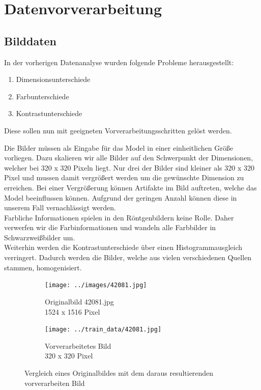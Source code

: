\chapter{Datenvorverarbeitung}
\label{ch:data_preprocessing}

\section{Bilddaten}

In der vorherigen Datenanalyse wurden folgende Probleme herausgestellt:

\begin{enumerate}
	\item{Dimensionsunterschiede}
	\item{Farbunterschiede}
	\item{Kontrastunterschiede}
\end{enumerate}

Diese sollen nun mit geeigneten Vorverarbeitungsschritten gelöst werden.

Die Bilder müssen als Eingabe für das Model in einer einheitlichen Größe vorliegen. Dazu skalieren wir alle Bilder auf den Schwerpunkt der Dimensionen, welcher bei 320 x 320 Pixeln liegt.
Nur drei der Bilder sind kleiner als 320 x 320 Pixel und mussen damit vergrößert werden um die gewünschte Dimension zu erreichen. Bei einer Vergrößerung können Artifakte im Bild auftreten, welche das Model beeinflussen können. Aufgrund der geringen Anzahl können diese in unserem Fall vernachlässigt werden.\\
Farbliche Informationen spielen in den Röntgenbildern keine Rolle. Daher verwerfen wir die Farbinformationen und wandeln alle Farbbilder in Schwarzweißbilder um.\\
Weiterhin werden die Kontrastunterschiede über einen Histogrammausgleich verringert. Dadurch werden die Bilder, welche aus vielen verschiedenen Quellen stammen, homogenisiert.

\begin{figure}[H]
	\centering
	\begin{subfigure}[b]{0.45\textwidth}
		\centering
		\texttt{[image: ../images/42081.jpg]}
		\caption{Originalbild 42081.jpg\\1524 x 1516 Pixel}
	\end{subfigure} \hfill
	\begin{subfigure}[b]{0.45\textwidth}
		\centering
		\texttt{[image: ../train\_data/42081.jpg]}
		\caption{Vorverarbeitetes Bild\\320 x 320 Pixel}
	\end{subfigure} \hfill
	\caption{Vergleich eines Originalbildes mit dem daraus resultierenden vorverarbeiten Bild}
\end{figure}

